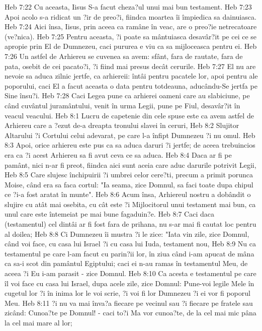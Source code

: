 Heb 7:22  Cu aceasta, Iisus S-a facut cheza?ul unui mai bun testament.
Heb 7:23  Apoi acolo s-a ridicat un ?ir de preo?i, fiindca moartea îi împiedica sa dainuiasca.
Heb 7:24  Aici însa, Iisus, prin aceea ca ramâne în veac, are o preo?ie netrecatoare (ve?nica).
Heb 7:25  Pentru aceasta, ?i poate sa mântuiasca desavâr?it pe cei ce se apropie prin El de Dumnezeu, caci pururea e viu ca sa mijloceasca pentru ei.
Heb 7:26  Un astfel de Arhiereu se cuvenea sa avem: sfânt, fara de rautate, fara de pata, osebit de cei pacato?i, ?i fiind mai presus decât cerurile.
Heb 7:27  El nu are nevoie sa aduca zilnic jertfe, ca arhiereii: întâi pentru pacatele lor, apoi pentru ale poporului, caci El a facut aceasta o data pentru totdeauna, aducându-Se jertfa pe Sine însu?i.
Heb 7:28  Caci Legea pune ca arhierei oameni care au slabiciune, pe când cuvântul juramântului, venit în urma Legii, pune pe Fiul, desavâr?it în veacul veacului.
Heb 8:1  Lucru de capetenie din cele spuse este ca avem astfel de Arhiereu care a ?ezut de-a dreapta tronului slavei în ceruri,
Heb 8:2  Slujitor Altarului ?i Cortului celui adevarat, pe care l-a înfipt Dumnezeu ?i nu omul.
Heb 8:3  Apoi, orice arhiereu este pus ca sa aduca daruri ?i jertfe; de aceea trebuincios era ca ?i acest Arhiereu sa fi avut ceva ce sa aduca.
Heb 8:4  Daca ar fi pe pamânt, nici n-ar fi preot, fiindca aici sunt aceia care aduc darurile potrivit Legii,
Heb 8:5  Care slujesc închipuirii ?i umbrei celor cere?ti, precum a primit porunca Moise, când era sa faca cortul: "Ia seama, zice Domnul, sa faci toate dupa chipul ce ?i-a fost aratat în munte".
Heb 8:6  Acum însa, Arhiereul nostru a dobândit o slujire cu atât mai osebita, cu cât este ?i Mijlocitorul unui testament mai bun, ca unul care este întemeiat pe mai bune fagaduin?e.
Heb 8:7  Caci daca (testamentul) cel dintâi ar fi fost fara de prihana, nu s-ar mai fi cautat loc pentru al doilea;
Heb 8:8  Ci Dumnezeu îi mustra ?i le zice: "Iata vin zile, zice Domnul, când voi face, cu casa lui Israel ?i cu casa lui Iuda, testament nou,
Heb 8:9  Nu ca testamentul pe care l-am facut cu parin?ii lor, în ziua când i-am apucat de mâna ca sa-i scot din pamântul Egiptului; caci ei n-au ramas în testamentul Meu, de aceea ?i Eu i-am parasit - zice Domnul.
Heb 8:10  Ca acesta e testamentul pe care îl voi face cu casa lui Israel, dupa acele zile, zice Domnul: Pune-voi legile Mele în cugetul lor ?i în inima lor le voi scrie, ?i voi fi lor Dumnezeu ?i ei vor fi poporul Meu.
Heb 8:11  ?i nu va mai înva?a fiecare pe vecinul sau ?i fiecare pe fratele sau zicând: Cunoa?te pe Domnul! - caci to?i Ma vor cunoa?te, de la cel mai mic pâna la cel mai mare al lor;
